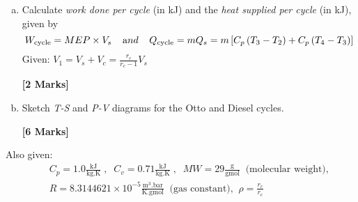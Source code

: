\documentclass[calculator,refrigeranttables,datasheet,resit]{exam}
\newcommand{\frc}{\displaystyle\frac}
\begin{document}
\begin{question}
\begin{enumerate}[(a)]
\item Calculate {\it work done per cycle} (in kJ) and the {\it heat supplied per cycle} (in kJ), given by
\begin{displaymath}
W_{\text{cycle}} = MEP \times V_{s} \;\;\;\;{\text and } \;\;\;\; Q_{\text{cycle}} = m Q_{s} = m \left[ C_{p}\left(T_{3}-T_{2}\right) + C_{p}\left(T_{4}-T_{3}\right)\right]  
\end{displaymath}
Given: $V_{1}=V_{s}+V_{c}=\frc{r_{c}}{r_{c}-1}V_{s}$
\begin{flushright}
{\bf [2 Marks]}
\end{flushright}

\item Sketch {\it T-S} and {\it P-V} diagrams for the Otto and Diesel cycles.
\begin{flushright}
{\bf [6 Marks]}
\end{flushright} 
%
\end{enumerate}

Also given: 
\begin{eqnarray}
&& C_{p}=1.0\frc{\text{kJ}}{\text{kg.K}}\;,\;\;C_{v}=0.71\frc{\text{kJ}}{\text{kg.K}}\;, \;\; MW=29 \frc{\text{g}}{\text{gmol}}\;\; \text{(molecular weight),} \nonumber \\
&& R=8.3144621\times 10^{-5}\frc{\text{m}^{3}.\text{bar}}{\text{K.gmol}}\;\;\text{(gas constant),}\;\; \rho = \frc{r_{c}}{r_{e}} \nonumber 
\end{eqnarray}

\end{question}

\clearpage
\end{document}
